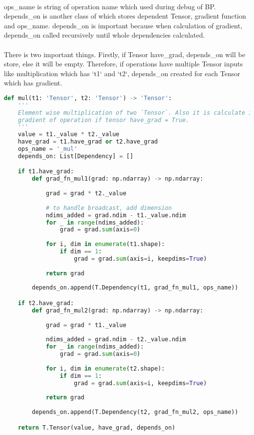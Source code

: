 \documentclass[12pt]{report}
\begin{document}
\paragraph{}
ops\_name is string of operation name which used during debug of BP. depends\_on is another class of which stores dependent Tensor, gradient function and ops\_name. depends\_on is important because when calculation of gradient, depends\_on called recursively until whole dependencies calculated. 

\paragraph{}
There is two important things. Firstly, if Tensor have\_grad, depends\_on will be store, else it will be empty. Therefore, if operations have multiple Tensor inputs like multiplication which has `t1` and `t2`, depends\_on created for each Tensor which has gradient.  

\begin{lstlisting}[language=Python, numbers=none, caption={mul operation.}, label={lis:mul-ops}]
def mul(t1: 'Tensor', t2: 'Tensor') -> 'Tensor':
	'''
	Element wise multiplication of two `Tensor`. Also it is calculate its 
	gradient of operation if tensor have_grad = True.
	'''
	value = t1._value * t2._value
	have_grad = t1.have_grad or t2.have_grad
	ops_name = '_mul'
	depends_on: List[Dependency] = []

	if t1.have_grad:
		def grad_fn_mul1(grad: np.ndarray) -> np.ndarray:
	
			grad = grad * t2._value
		
			# to handle broadcast, add dimension
			ndims_added = grad.ndim - t1._value.ndim
			for _ in range(ndims_added):
				grad = grad.sum(axis=0)
			
			for i, dim in enumerate(t1.shape):
				if dim == 1:
					grad = grad.sum(axis=i, keepdims=True)
			
			return grad
	
		depends_on.append(T.Dependency(t1, grad_fn_mul1, ops_name))

	if t2.have_grad:
		def grad_fn_mul2(grad: np.ndarray) -> np.ndarray:
		
			grad = grad * t1._value
			
			ndims_added = grad.ndim - t2._value.ndim
			for _ in range(ndims_added):
				grad = grad.sum(axis=0)
			
			for i, dim in enumerate(t2.shape):
				if dim == 1:
					grad = grad.sum(axis=i, keepdims=True)
			
			return grad
		
		depends_on.append(T.Dependency(t2, grad_fn_mul2, ops_name))

	return T.Tensor(value, have_grad, depends_on)
\end{lstlisting}
\end{document}
